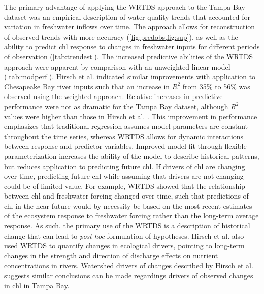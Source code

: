\documentclass{svjour3}\usepackage[]{graphicx}\usepackage[]{color}
\begin{document}
The primary advantage of applying the \ac{WRTDS} approach to the Tampa Bay dataset was an empirical description of water quality trends that accounted for variation in freshwater inflows over time. The approach allows for reconstruction of observed trends  with more accuracy (\cref{fig:predobs,fig:sup}), as well as the ability to predict \ac{chl} response to changes in freshwater inputs for different periods of observation (\cref{tab:trendest}). The increased predictive abilities of the \ac{WRTDS} approach were apparent by comparison with an unweighted linear model (\cref{tab:modperf}).  Hirsch et al. \cite{Hirsch10} indicated similar improvements with application to Chesapeake Bay river inputs such that an increase in $R^2$ from 35\% to 56\% was observed using the weighted approach.  Relative increases in predictive performance were not as dramatic for the Tampa Bay dataset, although $R^2$ values were higher than those in Hirsch et al. \cite{Hirsch10}.  This improvement in performance emphasizes that traditional regression assumes model parameters are constant throughout the time series, whereas \ac{WRTDS} allows for dynamic interactions between response and predictor variables.  Improved model fit through flexible parameterization increases the ability of the model to describe historical patterns, but reduces application to predicting future \ac{chl}.  If drivers of \ac{chl} are changing over time, predicting future \ac{chl} while assuming that drivers are not changing could be of limited value.  For example, \ac{WRTDS} showed that the relationship between \ac{chl} and freshwater forcing changed over time, such that predictions of \ac{chl} in the near future would by necessity be based on the most recent estimates of the ecosystem response to freshwater forcing rather than the long-term average response.  As such, the primary use of the \ac{WRTDS} is a description of historical change that can lead to \textit{post hoc} formulation of hypotheses.  Hirsch et al. \cite{Hirsch10} also used WRTDS to quantify changes in ecological drivers, pointing to long-term changes in the strength and direction of discharge effects on nutrient concentrations in rivers.  Watershed drivers of changes described by Hirsch et al. \cite{Hirsch10} suggests similar conclusions can be made regardings drivers of observed changes in \ac{chl} in Tampa Bay.  
\end{document}
